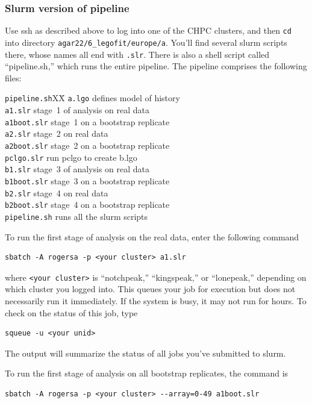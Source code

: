 \documentclass[11pt]{article}
\newenvironment{leftindent}%
{\begin{list}{}%
         {\setlength{\leftmargin}{2em}}%
         \item[]%
}{\end{list}}
\begin{document}
\subsubsection{Slurm version of pipeline}
\label{sec.slurmpipe}
Use ssh as described above to log into one of the CHPC clusters, and
then \texttt{cd} into directory
\verb|agar22/6_legofit/europe/a|. You'll find several slurm scripts
there, whose names all end with \texttt{.slr}. There is also a shell
script called ``pipeline.sh,'' which runs the entire pipeline. The
pipeline comprises the following files:
\begin{leftindent}
  \begin{tabbing}
\verb|pipeline.sh|XX\=\kill
\texttt{a.lgo} \> defines model of history\\    
\texttt{a1.slr} \> stage~1 of analysis on real data\\
\texttt{a1boot.slr} \> stage~1 on a bootstrap replicate\\
\texttt{a2.slr} \> stage~2 on real data\\
\texttt{a2boot.slr} \> stage~2 on a bootstrap replicate\\
\texttt{pclgo.slr} \> run pclgo to create b.lgo  \\
\texttt{b1.slr} \> stage~3 of analysis on real data\\
\texttt{b1boot.slr} \> stage~3 on a bootstrap replicate\\
\texttt{b2.slr} \> stage~4 on real data\\
\texttt{b2boot.slr} \> stage~4 on a bootstrap replicate\\
\verb|pipeline.sh| \> runs all the slurm scripts
\end{tabbing}
\end{leftindent}
To run the first stage of analysis on the real data, enter the
following command
\begin{verbatim}
sbatch -A rogersa -p <your cluster> a1.slr
\end{verbatim}
where \verb|<your cluster>| is ``notchpeak,'' ``kingspeak,'' or
``lonepeak,'' depending on which cluster you logged into.
This queues your job for execution but does not necessarily run it
immediately. If the system is busy, it may not run for hours. To check
on the status of this job, type
\begin{verbatim}
squeue -u <your unid>
\end{verbatim}
The output will summarize the status of all jobs you've submitted to
slurm.

To run the first stage of analysis on all bootstrap replicates, the
command is
\begin{verbatim}
sbatch -A rogersa -p <your cluster> --array=0-49 a1boot.slr
\end{verbatim}
\end{document}
